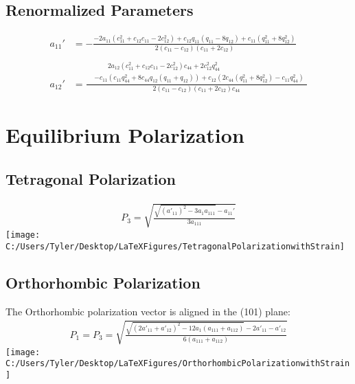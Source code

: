 \documentclass{article}
\begin{document}
\subsection{Renormalized Parameters}
\begin{align}
a_{11}'&=-\frac{-2 a_{11} \left(c_{11}^2+c_{12} c_{11}-2 c_{12}^2\right)+c_{12} q_{11} \left(q_{11}-8 q_{12}\right)+c_{11} \left(q_{11}^2+8 q_{12}^2\right)}{2 \left(c_{11}-c_{12}\right) \left(c_{11}+2 c_{12}\right)} \\
\nonumber \\
a_{12}'&=\frac{\begin{aligned}
                       & \qquad 2 a_{12} \left(c_{11}^2+c_{12} c_{11}-2 c_{12}^2\right) c_{44}+ 2 c_{12}^2 q_{44}^2 \\
                       &-c_{11} \left(c_{11} q_{44}^2+8 c_{44} q_{12}                 \left(q_{11}+q_{12}\right)\right)
                                 +c_{12} \left(2 c_{44} \left(q_{11}^2+8 q_{12}^2\right)-c_{11} q_{44}^2\right) \end{aligned}}
      {2 \left(c_{11}-c_{12}\right) \left(c_{11}+2 c_{12}\right) c_{44}}
\end{align}


\newpage
\section{Equilibrium Polarization}

\subsection{Tetragonal Polarization}
\begin{align}
P_3= \sqrt{\frac{\sqrt{(a'_{11})^{2}-3 a_1 a_{111}}-a_{11}'}{3 a_{111}}}
\end{align}
\texttt{[image: C:/Users/Tyler/Desktop/LaTeXFigures/TetragonalPolarizationwithStrain]}

\subsection{Orthorhombic Polarization}
The Orthorhombic polarization vector is aligned in the (101) plane:
\begin{align}
P_1=P_3= \sqrt{\frac{\sqrt{(2 a'_{11}+a'_{12})^2-12 a_1 \left(a_{111}+a_{112}\right)}-2 a'_{11}-a'_{12}}{6(a_{111}+a_{112})}}
\end{align}
\texttt{[image: C:/Users/Tyler/Desktop/LaTeXFigures/OrthorhombicPolarizationwithStrain]}
\end{document}
